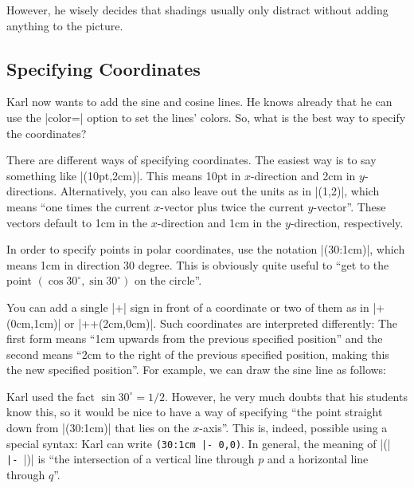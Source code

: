 However, he wisely decides that shadings usually only distract without adding
anything to the picture.


\subsection{Specifying Coordinates}

Karl now wants to add the sine and cosine lines. He knows already that he can
use the |color=| option to set the lines' colors. So, what is the best way to
specify the coordinates?

There are different ways of specifying coordinates. The easiest way is to say
something like |(10pt,2cm)|. This means 10pt in $x$-direction and 2cm in
$y$-directions. Alternatively, you can also leave out the units as in |(1,2)|,
which means ``one times the current $x$-vector plus twice the current
$y$-vector''. These vectors default to 1cm in the $x$-direction and 1cm in the
$y$-direction, respectively.

In order to specify points in polar coordinates, use the notation |(30:1cm)|,
which means 1cm in direction 30 degree. This is obviously quite useful to ``get
to the point $(\cos 30^\circ,\sin 30^\circ)$ on the circle''.

You can add a single |+| sign in front of a coordinate or two of them as in
|+(0cm,1cm)| or |++(2cm,0cm)|. Such coordinates are interpreted differently:
The first form means ``1cm upwards from the previous specified position'' and
the second means ``2cm to the right of the previous specified position, making
this the new specified position''. For example, we can draw the sine line as
follows:
%
\begin{codeexample}[]
\end{codeexample}

Karl used the fact $\sin 30^\circ = 1/2$. However, he very much doubts that his
students know this, so it would be nice to have a way of specifying ``the point
straight down from |(30:1cm)| that lies on the $x$-axis''. This is, indeed,
possible using a special syntax: Karl can write \verb!(30:1cm |- 0,0)!. In
general, the meaning of |(|\verb! |- !|)| is ``the intersection
of a vertical line through $p$ and a horizontal line through $q$''.

